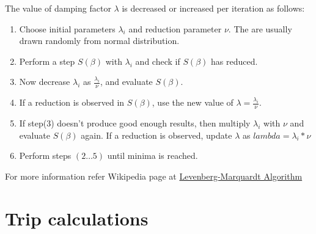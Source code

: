 \documentclass[20pt, a4paper]{report}
\begin{document}
	The value of damping factor $\lambda$ is decreased or increased per iteration as follows:
	\begin{enumerate}
	\item Choose initial parameters $\lambda_{i}$ and reduction parameter $\nu$. The are usually drawn randomly from normal distribution. 
	\item Perform a step $S(\beta)$ with $\lambda_{i}$ and check if $S(\beta)$ has reduced.
	\item Now decrease $\lambda_{i}$ as $\frac{\lambda_{i} }{\nu}$, and evaluate $S(\beta)$. 
	\item If a reduction is observed in $S(\beta)$, use the new value of $\lambda = \frac{\lambda_{i} }{\nu}$.
	\item If step(3) doesn't produce good enough results, then multiply $\lambda_{i}$ with $\nu$ and evaluate $S(\beta)$ again. If a reduction is observed, update $\lambda$ as $lambda = \lambda_{i}*\nu$
	\item Perform steps $(2\ldots 5)$ until minima is reached.
\end{enumerate}	
	 
		For more information refer Wikipedia page at \href{https://en.wikipedia.org/wiki/Levenberg%E2%80%93Marquardt_algorithm}{Levenberg-Marquardt Algorithm}
			
			\section{Trip calculations}
\end{document}
